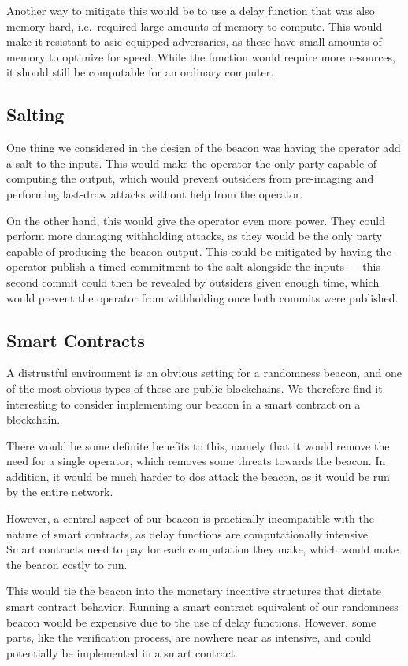 Another way to mitigate this would be to use a delay function that was also memory-hard, i.e.\ required large amounts of memory to compute.
This would make it resistant to \gls{asic}-equipped adversaries, as these have small amounts of memory to optimize for speed.
While the function would require more resources, it should still be computable for an ordinary computer.

\subsection{Salting}
One thing we considered in the design of the beacon was having the operator add a salt to the inputs.
This would make the operator the only party capable of computing the output, which would prevent outsiders from pre-imaging and performing last-draw attacks without help from the operator.

On the other hand, this would give the operator even more power.
They could perform more damaging withholding attacks, as they would be the only party capable of producing the beacon output.
This could be mitigated by having the operator publish a timed commitment to the salt alongside the inputs --- this second commit could then be revealed by outsiders given enough time, which would prevent the operator from withholding once both commits were published.

\subsection{Smart Contracts}
A distrustful environment is an obvious setting for a randomness beacon, and one of the most obvious types of these are public blockchains.
We therefore find it interesting to consider implementing our beacon in a smart contract on a blockchain.

There would be some definite benefits to this, namely that it would remove the need for a single operator, which removes some threats towards the beacon.
In addition, it would be much harder to \gls{dos} attack the beacon, as it would be run by the entire network.

However, a central aspect of our beacon is practically incompatible with the nature of smart contracts, as delay functions are computationally intensive.
Smart contracts need to pay for each computation they make, which would make the beacon costly to run.

This would tie the beacon into the monetary incentive structures that dictate smart contract behavior.
Running a smart contract equivalent of our randomness beacon would be expensive due to the use of delay functions.
However, some parts, like the verification process, are nowhere near as intensive, and could potentially be implemented in a smart contract.

